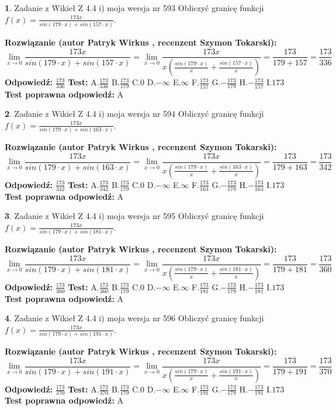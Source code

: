 \documentclass[12pt, a4paper]{article}
\theoremstyle{definition} %
\newtheorem{zad}{}
\newcommand{\zadStart}[1]{\begin{zad}#1\newline}
\newcommand{\zadStop}{\end{zad}}
\newcommand{\rozwStart}[2]{\noindent \textbf{Rozwiązanie (autor #1 , recenzent #2): }\newline}
\newcommand{\rozwStop}{\newline}
\newcommand{\odpStart}{\noindent \textbf{Odpowiedź:}\newline}
\newcommand{\odpStop}{\newline}
\newcommand{\testStart}{\noindent \textbf{Test:}\newline}
\newcommand{\testStop}{\newline}
\newcommand{\kluczStart}{\noindent \textbf{Test poprawna odpowiedź:}\newline}
\newcommand{\kluczStop}{\newline}
\begin{document}
\zadStart{Zadanie z Wikieł Z 4.4 i) moja wersja nr 593}
Obliczyć granicę funkcji $f(x)=\frac{173x}{sin(179\cdot x) +sin(157\cdot x)}$.
\zadStop
\rozwStart{Patryk Wirkus}{Szymon Tokarski}
$$\lim\limits_{x\to 0}\frac{173x}{sin(179\cdot x) +sin(157\cdot x)}=\lim\limits_{x\to 0}\frac{173x}{x(\frac{sin(179\cdot x)}{x}+\frac{sin(157\cdot x)}{x})}=\frac{173}{179+157} = \frac{173}{336}$$
\rozwStop
\odpStart
$\frac{173}{336}$
\odpStop
\testStart
A.$\frac{173}{336}$
B.$\frac{173}{179}$
C.$0$
D.$-\infty$
E.$\infty$
F.$\frac{173}{157}$
G.$-\frac{173}{179}$
H.$-\frac{173}{157}$
I.$173$
\testStop
\kluczStart
A
\kluczStop



\zadStart{Zadanie z Wikieł Z 4.4 i) moja wersja nr 594}
Obliczyć granicę funkcji $f(x)=\frac{173x}{sin(179\cdot x) +sin(163\cdot x)}$.
\zadStop
\rozwStart{Patryk Wirkus}{Szymon Tokarski}
$$\lim\limits_{x\to 0}\frac{173x}{sin(179\cdot x) +sin(163\cdot x)}=\lim\limits_{x\to 0}\frac{173x}{x(\frac{sin(179\cdot x)}{x}+\frac{sin(163\cdot x)}{x})}=\frac{173}{179+163} = \frac{173}{342}$$
\rozwStop
\odpStart
$\frac{173}{342}$
\odpStop
\testStart
A.$\frac{173}{342}$
B.$\frac{173}{179}$
C.$0$
D.$-\infty$
E.$\infty$
F.$\frac{173}{163}$
G.$-\frac{173}{179}$
H.$-\frac{173}{163}$
I.$173$
\testStop
\kluczStart
A
\kluczStop



\zadStart{Zadanie z Wikieł Z 4.4 i) moja wersja nr 595}
Obliczyć granicę funkcji $f(x)=\frac{173x}{sin(179\cdot x) +sin(181\cdot x)}$.
\zadStop
\rozwStart{Patryk Wirkus}{Szymon Tokarski}
$$\lim\limits_{x\to 0}\frac{173x}{sin(179\cdot x) +sin(181\cdot x)}=\lim\limits_{x\to 0}\frac{173x}{x(\frac{sin(179\cdot x)}{x}+\frac{sin(181\cdot x)}{x})}=\frac{173}{179+181} = \frac{173}{360}$$
\rozwStop
\odpStart
$\frac{173}{360}$
\odpStop
\testStart
A.$\frac{173}{360}$
B.$\frac{173}{179}$
C.$0$
D.$-\infty$
E.$\infty$
F.$\frac{173}{181}$
G.$-\frac{173}{179}$
H.$-\frac{173}{181}$
I.$173$
\testStop
\kluczStart
A
\kluczStop



\zadStart{Zadanie z Wikieł Z 4.4 i) moja wersja nr 596}
Obliczyć granicę funkcji $f(x)=\frac{173x}{sin(179\cdot x) +sin(191\cdot x)}$.
\zadStop
\rozwStart{Patryk Wirkus}{Szymon Tokarski}
$$\lim\limits_{x\to 0}\frac{173x}{sin(179\cdot x) +sin(191\cdot x)}=\lim\limits_{x\to 0}\frac{173x}{x(\frac{sin(179\cdot x)}{x}+\frac{sin(191\cdot x)}{x})}=\frac{173}{179+191} = \frac{173}{370}$$
\rozwStop
\odpStart
$\frac{173}{370}$
\odpStop
\testStart
A.$\frac{173}{370}$
B.$\frac{173}{179}$
C.$0$
D.$-\infty$
E.$\infty$
F.$\frac{173}{191}$
G.$-\frac{173}{179}$
H.$-\frac{173}{191}$
I.$173$
\testStop
\kluczStart
A
\kluczStop
\end{document}
